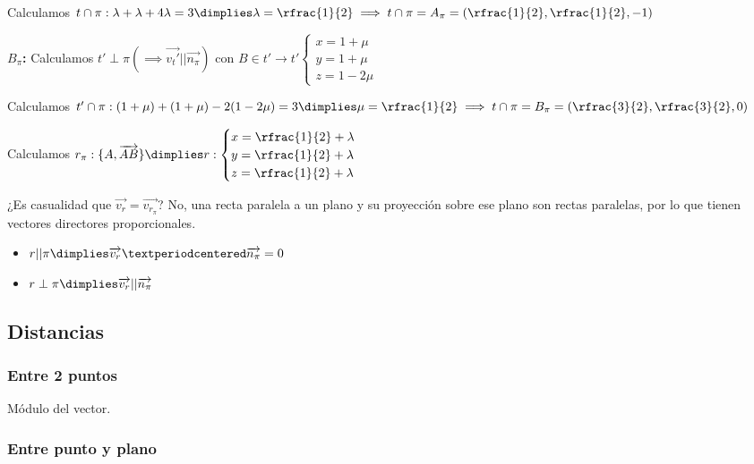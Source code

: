 \begin{problem}
\begin{enumerate}
  Calculamos $t\cap\pi: \lambda+\lambda+4\lambda=3\dimplies \lambda=\rfrac{1}{2} \implies t\cap\pi =A_{\pi}=\left(\rfrac{1}{2},\rfrac{1}{2},-1\right)$

  \textbf{$B_{\pi}$:} Calculamos $t'\perp\pi (\implies \vec{v_t'}||\vec{n_{\pi}})$ con $B\in t'\to t'\begin{cases}x=1+\mu\\y=1+\mu\\z=1-2\mu\end{cases}$

  Calculamos $t'\cap\pi: (1+\mu)+(1+\mu)-2(1-2\mu)=3\dimplies \mu=\rfrac{1}{2} \implies t\cap\pi =B_{\pi}=\left(\rfrac{3}{2},\rfrac{3}{2},0\right)$

  Calculamos $r_{\pi}:\{A,\vec{AB}\} \dimplies r:\begin{cases}x=\rfrac{1}{2}+\lambda\\y=\rfrac{1}{2}+\lambda\\z=\rfrac{1}{2}+\lambda\end{cases}$

\obs ¿Es casualidad que $\vec{v_r} = \vec{v_{r_{\pi}}}$? No, una recta paralela a un plano y su proyección sobre ese plano son rectas paralelas, por lo que tienen vectores directores proporcionales.

\end{enumerate}

\end{problem}


\begin{itemize}
  \item $r || \pi \dimplies \vec{v_r}·\vec{n_{\pi}} = 0$
  \item $r\perp \pi \dimplies \vec{v_r}||\vec{n_{\pi}}$
\end{itemize}

\subsection{Distancias}
\subsubsection{Entre 2 puntos}
Módulo del vector.

\subsubsection{Entre punto y plano}

